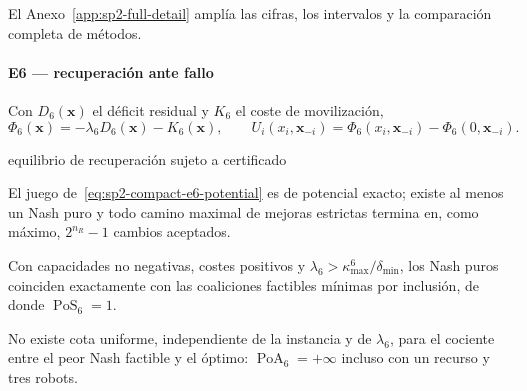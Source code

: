 \begin{table}[!htbp]
  \centering
  \caption{Resultados pareados del experimento principal de acoplamiento dinámico.}
  \label{tab:sp2-compact-e4-docking}
  \resizebox{\textwidth}{!}{}
  \viuownsource
\end{table}

El Anexo~\ref{app:sp2-full-detail} amplía las cifras, los intervalos y la comparación completa de métodos.

\paragraph{E6 --- recuperación ante fallo}
Con $D_6(\boldsymbol x)$ el déficit residual y $K_6$ el coste de movilización,
\begin{equation}
 \Phi_6(\boldsymbol x)=-\lambda_6D_6(\boldsymbol x)-K_6(\boldsymbol x),\qquad
 U_i(x_i,\boldsymbol x_{-i})=\Phi_6(x_i,\boldsymbol x_{-i})-\Phi_6(0,\boldsymbol x_{-i}).
 \label{eq:sp2-compact-e6-potential}
\end{equation}

\begin{contribucion}{equilibrio de recuperación sujeto a certificado}
\begin{teorema}
\label{thm:sp2-compact-e6-exact-potential}
El juego de~\eqref{eq:sp2-compact-e6-potential} es de potencial exacto; existe al menos un Nash puro y todo camino maximal de mejoras estrictas termina en, como máximo, $2^{n_R}-1$ cambios aceptados.
\end{teorema}
\begin{teorema}
\label{thm:sp2-compact-e6-feasible-nash}
Con capacidades no negativas, costes positivos y $\lambda_6>\kappa_{\max}^6/\delta_{\min}$, los Nash puros coinciden exactamente con las coaliciones factibles mínimas por inclusión, de donde $\operatorname{PoS}_6=1$.
\end{teorema}
\begin{proposicion}
\label{prop:sp2-compact-e6-unbounded-poa}
No existe cota uniforme, independiente de la instancia y de $\lambda_6$, para el cociente entre el peor Nash factible y el óptimo: $\operatorname{PoA}_6=+\infty$ incluso con un recurso y tres robots.
\end{proposicion}
\end{contribucion}

